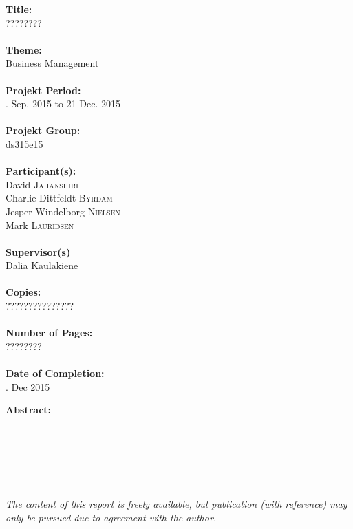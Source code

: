 \vspace{1cm}\hspace{-1cm}\begin{minipage}{0.5\textwidth}
\textbf{Title: } \\
\noindent ???????? \\
$ $ \\
\noindent \textbf{Theme:} \\
\noindent Business Management \\
$ $ \\
\noindent \textbf{Projekt Period:} \\
. Sep. 2015 to 21 Dec. 2015 \\
$ $ \\
\noindent \textbf{Projekt Group:} \\
\noindent ds315e15 \\
$ $ \\
\textbf{Participant(s):} \\
\noindent David \textsc{Jahanshiri} \\
\noindent Charlie Dittfeldt \textsc{Byrdam} \\
\noindent Jesper Windelborg \textsc{Nielsen} \\
\noindent Mark \textsc{Lauridsen} \\
$ $ \\
\noindent \textbf{Supervisor(s)} \\
\noindent Dalia Kaulakiene \\
$ $ \\
\noindent \textbf{Copies:} \\
\noindent ??????????????? \\
$ $ \\
\noindent \textbf{Number of Pages:} \\
\noindent ???????? \\
$ $ \\
\noindent \textbf{Date of Completion:}\\
. Dec 2015\\
\end{minipage}
\hspace{1cm}\begin{minipage}{0.5\textwidth}
\textbf{Abstract:} \\

$ $ \\
$ $ \\
$ $ \\
$ $ \\
$ $ \\
$ $ \\
\textit{The content of this report is freely available, but publication (with reference) may only be pursued due to agreement with the author.}
\end{minipage}

